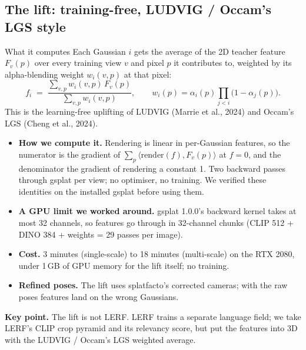\documentclass[11pt,a4paper]{article}
\newcommand{\keypt}[1]{\begin{key}\sffamily\small\textbf{Key point.} #1\end{key}}
\begin{document}
\subsection{The lift: training-free, LUDVIG / Occam's LGS style}\label{sec:lift}
\begin{tech}{What it computes}
Each Gaussian $i$ gets the average of the 2D teacher feature $F_v(p)$ over every training view $v$ and
pixel $p$ it contributes to, weighted by its alpha-blending weight $w_i(v,p)$ at that pixel:
\[
  f_i \;=\; \frac{\sum_{v,p} w_i(v,p)\,F_v(p)}{\sum_{v,p} w_i(v,p)},\qquad
  w_i(p) = \alpha_i(p)\prod_{j<i}\bigl(1-\alpha_j(p)\bigr).
\]
This is the learning-free uplifting of LUDVIG (Marrie et al., 2024) and Occam's LGS (Cheng et al., 2024).
\end{tech}
\begin{itemize}
  \item \textbf{How we compute it.} Rendering is linear in per-Gaussian features, so the numerator is the
    gradient of $\sum_p \langle \mathrm{render}(f), F_v(p)\rangle$ at $f=0$, and the denominator the gradient
    of rendering a constant 1. Two backward passes through gsplat per view; no optimiser, no training. We
    verified these identities on the installed gsplat before using them.
  \item \textbf{A GPU limit we worked around.} gsplat 1.0.0's backward kernel takes at most 32 channels,
    so features go through in 32-channel chunks (CLIP 512 + DINO 384 + weights = 29 passes per image).
  \item \textbf{Cost.} 3 minutes (single-scale) to 18 minutes (multi-scale) on the RTX 2080, under 1\,GB of GPU memory for the lift itself; no training.
  \item \textbf{Refined poses.} The lift uses splatfacto's corrected cameras; with the raw poses features
    land on the wrong Gaussians.
\end{itemize}
\keypt{The lift is not LERF. LERF trains a separate language field; we take LERF's CLIP crop pyramid and
its relevancy score, but put the features into 3D with the LUDVIG / Occam's LGS weighted average.}
\end{document}

